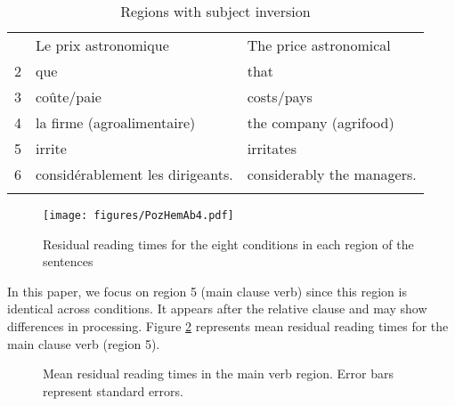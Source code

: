 \documentclass[output=paper]{langscibook}
\begin{document}
\begin{table}
 \begin{tabular}{lll}
 \lsptoprule
 1 & Le prix astronomique & The  price astronomical\\ 
 2 & que & that\\                     
 3 & coûte/paie & costs/pays\\                                           
 4 & la firme (agroalimentaire) & the company (agrifood) \\                              
 5 & irrite & irritates\\                               
 6 & considérablement les dirigeants. & considerably the managers.\\                                                                
 \lspbottomrule                                                        
 \end{tabular}
 \caption{Regions with subject inversion\label{tab:6}}
\end{table}



\begin{figure}
\texttt{[image: figures/PozHemAb4.pdf]}
\caption{Residual reading times for the eight conditions in each region of the sentences}
\label{figureselfpacedallresults}
\end{figure}


In this paper, we focus on region 5 (main clause verb) since this region is identical across conditions. It appears after the relative clause and may show differences in processing. Figure \ref{figureselfpacedregion5} represents mean residual reading times for the main clause verb (region 5).

\begin{figure}
\caption{Mean residual reading times in the main verb region. Error bars represent standard errors.}
\label{figureselfpacedregion5}
\end{figure}
\end{document}
